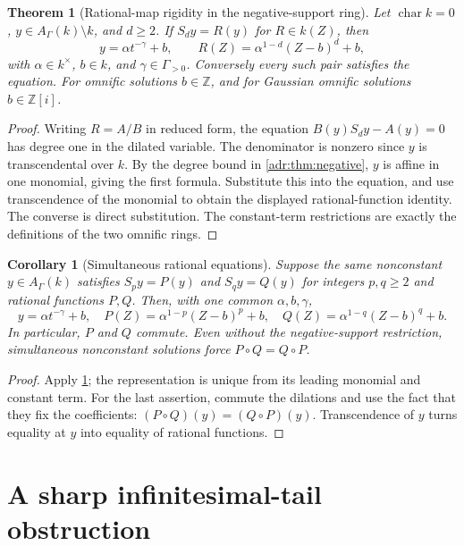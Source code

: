 \documentclass[11pt,letterpaper]{article}
\numberwithin{equation}{section}
\newtheorem{theorem}{Theorem}[section]
\newtheorem{corollary}[corollary]{Corollary}
\theoremstyle{definition}
\theoremstyle{remark}
\newcommand{\Z}{\mathbb Z}
\newcommand{\A}{A_\Gamma(k)}
\begin{document}
\begin{theorem}[Rational-map rigidity in the negative-support ring]
\label{adr:thm:rational-negative}
Let $\operatorname{char}k=0$, $y\in\A\setminus k$, and $d\ge2$.
If $S_dy=R(y)$ for $R\in k(Z)$, then
\begin{equation}\label{adr:eq:affine-monomial}
 y=\alpha t^{-\gamma}+b,
 \qquad
 R(Z)=\alpha^{1-d}(Z-b)^d+b,
\end{equation}
with $\alpha\in k^\times$, $b\in k$, and $\gamma\in\Gamma_{>0}$.
Conversely every such pair satisfies the equation.
For omnific solutions $b\in\Z$, and for Gaussian omnific solutions
$b\in\Z[i]$.
\end{theorem}
\begin{proof}
Writing $R=A/B$ in reduced form, the equation
$B(y)S_dy-A(y)=0$ has degree one in the dilated variable. The denominator
is nonzero since $y$ is transcendental over $k$. By the degree bound in
\cref{adr:thm:negative}, $y$ is affine in one monomial, giving the first
formula. Substitute this into the equation, and use transcendence of
the monomial to obtain the displayed rational-function identity.
The converse is direct substitution. The constant-term restrictions
are exactly the definitions of the two omnific rings.
\end{proof}

\begin{corollary}[Simultaneous rational equations]\label{adr:cor:simultaneous}
Suppose the same nonconstant $y\in\A$ satisfies
$S_py=P(y)$ and $S_qy=Q(y)$ for integers $p,q\ge2$ and rational functions
$P,Q$. Then, with one common $\alpha,b,\gamma$,
\[
 y=\alpha t^{-\gamma}+b,\quad
 P(Z)=\alpha^{1-p}(Z-b)^p+b,\quad
 Q(Z)=\alpha^{1-q}(Z-b)^q+b.
\]
In particular, $P$ and $Q$ commute. Even without the negative-support
restriction, simultaneous nonconstant solutions force $P\circ Q=Q\circ P$.
\end{corollary}
\begin{proof}
Apply \cref{adr:thm:rational-negative}; the representation is unique from
its leading monomial and constant term. For the last assertion, commute
the dilations and use the fact that they fix the coefficients:
$(P\circ Q)(y)=(Q\circ P)(y)$. Transcendence of $y$ turns equality at
$y$ into equality of rational functions.
\end{proof}

\section{A sharp infinitesimal-tail obstruction}\label{adr:sec:tail}
\end{document}
